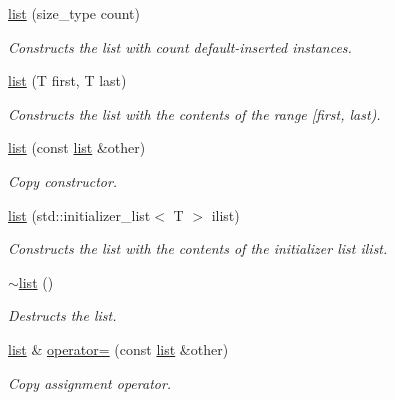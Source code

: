 \begin{DoxyCompactItemize}
\mbox{\hyperlink{classsc_1_1list_a38c946e7fe092c01ea0c0fc3be19d11c}{list}} (size\+\_\+type count)
\begin{DoxyCompactList}\small\item\em Constructs the list with {\ttfamily count} default-\/inserted instances. \end{DoxyCompactList}\item 
\mbox{\hyperlink{classsc_1_1list_a3e0d4a870300bac8315d92b59463a7eb}{list}} (T first, T last)
\begin{DoxyCompactList}\small\item\em Constructs the list with the contents of the range \mbox{[}first, last). \end{DoxyCompactList}\item 
\mbox{\hyperlink{classsc_1_1list_a1fe5b60798e979cb0a5b1663d64ec69b}{list}} (const \mbox{\hyperlink{classsc_1_1list}{list}} \&other)
\begin{DoxyCompactList}\small\item\em Copy constructor. \end{DoxyCompactList}\item 
\mbox{\hyperlink{classsc_1_1list_ae85152bcf538c929944790b1c30d3b22}{list}} (std\+::initializer\+\_\+list$<$ T $>$ ilist)
\begin{DoxyCompactList}\small\item\em Constructs the list with the contents of the initializer list ilist. \end{DoxyCompactList}\item 
\mbox{\label{classsc_1_1list_a3399256b9e2fa57bee383c2421722214}} 
\mbox{\hyperlink{classsc_1_1list_a3399256b9e2fa57bee383c2421722214}{$\sim$list}} ()
\begin{DoxyCompactList}\small\item\em Destructs the list. \end{DoxyCompactList}\item 
\mbox{\label{classsc_1_1list_a165b552f431a269ef9a727d821250664}} 
\mbox{\hyperlink{classsc_1_1list}{list}} \& \mbox{\hyperlink{classsc_1_1list_a165b552f431a269ef9a727d821250664}{operator=}} (const \mbox{\hyperlink{classsc_1_1list}{list}} \&other)
\begin{DoxyCompactList}\small\item\em Copy assignment operator. \end{DoxyCompactList}\item 

\end{DoxyCompactItemize}
